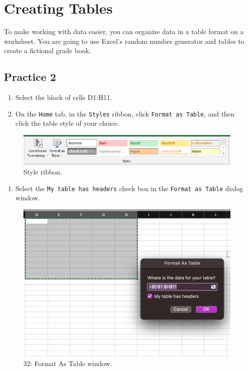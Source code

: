 \documentclass[
]{book}
\providecommand{\tightlist}{%
  \setlength{\itemsep}{0pt}\setlength{\parskip}{0pt}}
\begin{document}
\hypertarget{creating-tables}{%
\section{Creating Tables}\label{creating-tables}}

To make working with data easier, you can organize data in a table format on a worksheet.
You are going to use Excel's random number generator and tables to create a fictional grade book.

\hypertarget{practice-2-1}{%
\subsection{Practice 2}\label{practice-2-1}}

\begin{enumerate}
\def\labelenumi{\arabic{enumi}.}
\tightlist
\item
  Select the block of cells D1:H11.
\item
  On the \texttt{Home} tab, in the \texttt{Styles} ribbon, click \texttt{Format\ as\ Table}, and then click the table style of your choice.
\end{enumerate}

\begin{figure}

{\centering \includegraphics[width=0.9\linewidth]{style-pc} 

}

\caption{Style ribbon.}\label{fig:table-style-group}
\end{figure}

\begin{enumerate}
\def\labelenumi{\arabic{enumi}.}
\setcounter{enumi}{2}
\tightlist
\item
  Select the \texttt{My\ table\ has\ headers} check box in the \texttt{Format\ as\ Table} dialog window.
\end{enumerate}

\begin{figure}

{\centering \includegraphics[width=0.7\linewidth]{format-table} 

}

\caption{32: Format As Table window.}\label{fig:format-as-table}
\end{figure}
\end{document}
